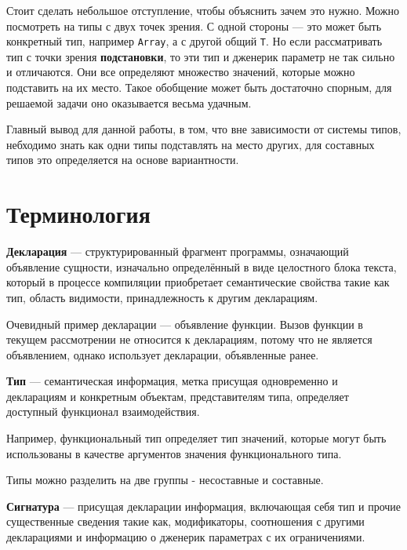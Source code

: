 \documentclass[times]{itmo-student-thesis}
\begin{document}
	Стоит сделать небольшое отступление, чтобы объяснить зачем это нужно. Можно посмотреть на типы с двух точек зрения. С одной стороны --- это может быть конкретный тип, например  \lstinline{Array}, а с другой общий  \lstinline{T}. Но если рассматривать тип с точки зрения \textbf{подстановки}, то эти тип и дженерик параметр не так сильно и отличаются. Они все определяют множество значений, которые можно подставить на их место. Такое обобщение может быть достаточно спорным, для решаемой задачи оно оказывается весьма удачным.
	
	Главный вывод для данной работы, в том, что вне зависимости от системы типов, небходимо знать как одни типы подставлять на место других, для составных типов это определяется на основе вариантности.
	
	\section{Терминология}
	
	\begin{definition}
		\textbf{Декларация} --- структурированный фрагмент программы, означающий объявление сущности, изначально определённый в виде целостного блока текста, который в процессе компиляции приобретает семантические свойства такие как тип, область видимости, принадлежность к другим декларациям. 
	\end{definition}
	
	Очевидный пример декларации --- объявление функции. Вызов функции в текущем рассмотрении не относится к декларациям, потому что не является объявлением, однако использует декларации, объявленные ранее.
	
	\begin{definition}
		\textbf{Тип} --- семантическая информация, метка присущая одновременно и декларациям и конкретным объектам, представителям типа, определяет доступный функционал взаимодействия.
	\end{definition}
	
	Например, функциональный тип определяет тип значений, которые могут быть использованы в качестве аргументов значения функционального типа.
	
	Типы можно разделить на две группы - несоставные и составные. 
	
	\begin{definition}
		\textbf{Сигнатура} --- присущая декларации информация, включающая себя тип и прочие существенные сведения такие как, модификаторы, соотношения с другими декларациями и информацию о дженерик параметрах с их ограничениями.
	\end{definition}
	
\end{document}
